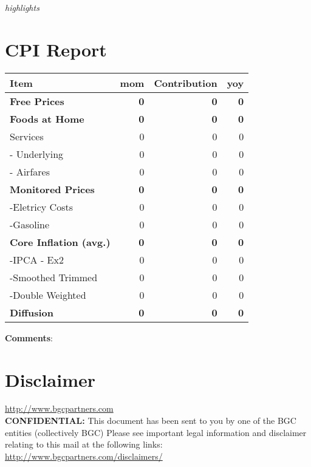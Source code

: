 \documentclass{report}
\date{}
\title{}
\begin{document}
\thispagestyle{firstpagestyle}
\JournalIssue
    \begin{tcolorbox}[colbak=red!5!white, colframe=red!0!white]
     \it{{highlights}}
    \end{tcolorbox}
\vspace{-0.5cm}

\section{CPI Report}
\label{sec:orgf5f94fd}

\begin{center}
\begin{tabular}{lrrr}
\textbf{Item} & \textbf{mom} & \textbf{Contribution} & \textbf{yoy}\\
\hline
\textbf{Free Prices} & \textbf{0} & \textbf{0} & \textbf{0}\\
\textbf{Foods at Home} & \textbf{0} & \textbf{0} & \textbf{0}\\
Services & 0 & 0 & 0\\
- Underlying & 0 & 0 & 0\\
- Airfares & 0 & 0 & 0\\
\textbf{Monitored Prices} & \textbf{0} & \textbf{0} & \textbf{0}\\
-Eletricy Costs & 0 & 0 & 0\\
-Gasoline & 0 & 0 & 0\\
\textbf{Core Inflation (avg.)} & \textbf{0} & \textbf{0} & \textbf{0}\\
-IPCA - Ex2 & 0 & 0 & 0\\
-Smoothed Trimmed & 0 & 0 & 0\\
-Double Weighted & 0 & 0 & 0\\
\textbf{Diffusion} & \textbf{0} & \textbf{0} & \textbf{0}\\
\end{tabular}
\end{center}
\textbf{Comments}:



\newpage

\section{Disclaimer}
\label{sec:orgec37116}
\url{http://www.bgcpartners.com} \\
\textbf{CONFIDENTIAL:} This document has been sent to you by one of
the BGC entities (collectively BGC) Please see important legal
information and disclaimer relating to this mail at the following
links: \url{http://www.bgcpartners.com/disclaimers/}
\end{document}
